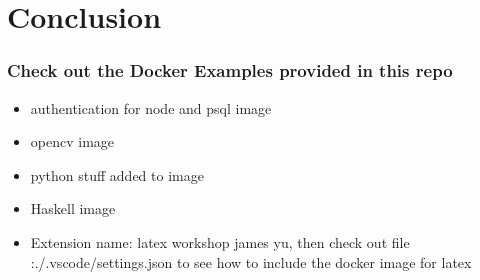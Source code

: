 \documentclass{beamer}
\begin{document}
\section{Conclusion}
\begin{frame}\frametitle{Check out the Docker Examples provided in this repo}
\begin{itemize}
\item authentication for node and psql image
\item opencv image
\item python stuff added to image
\item Haskell image
\item Extension name: latex workshop james yu, then check out file :./.vscode/settings.json to see how to include the docker image for latex
\end{itemize}
\end{frame}


\end{document}
